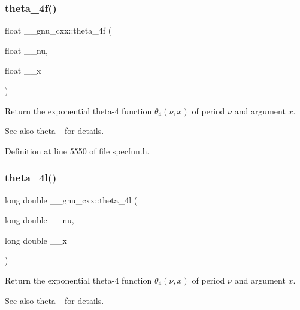 \subsubsection{\texorpdfstring{theta\+\_\+4f()}{theta\_4f()}}
{\footnotesize\ttfamily float \+\_\+\+\_\+gnu\+\_\+cxx\+::theta\+\_\+4f (\begin{DoxyParamCaption}\item[{float}]{\+\_\+\+\_\+nu,  }\item[{float}]{\+\_\+\+\_\+x }\end{DoxyParamCaption})\hspace{0.3cm}{\ttfamily [inline]}}

Return the exponential theta-\/4 function $ \theta_4(\nu,x) $ of period $ \nu $ and argument $ x $.

\begin{DoxySeeAlso}{See also}
\hyperlink{group__gnu__math__spec__func_ga8a6f8b69272a9f205a13e1745832ada3}{theta\+\_} for details. 
\end{DoxySeeAlso}


Definition at line 5550 of file specfun.\+h.

\mbox{\label{group__gnu__math__spec__func_gaaf63a80e90cdcdd66ebb18cd3a84afae}} 
\subsubsection{\texorpdfstring{theta\+\_\+4l()}{theta\_4l()}}
{\footnotesize\ttfamily long double \+\_\+\+\_\+gnu\+\_\+cxx\+::theta\+\_\+4l (\begin{DoxyParamCaption}\item[{long double}]{\+\_\+\+\_\+nu,  }\item[{long double}]{\+\_\+\+\_\+x }\end{DoxyParamCaption})\hspace{0.3cm}{\ttfamily [inline]}}

Return the exponential theta-\/4 function $ \theta_4(\nu,x) $ of period $ \nu $ and argument $ x $.

\begin{DoxySeeAlso}{See also}
\hyperlink{group__gnu__math__spec__func_ga8a6f8b69272a9f205a13e1745832ada3}{theta\+\_} for details. 
\end{DoxySeeAlso}


